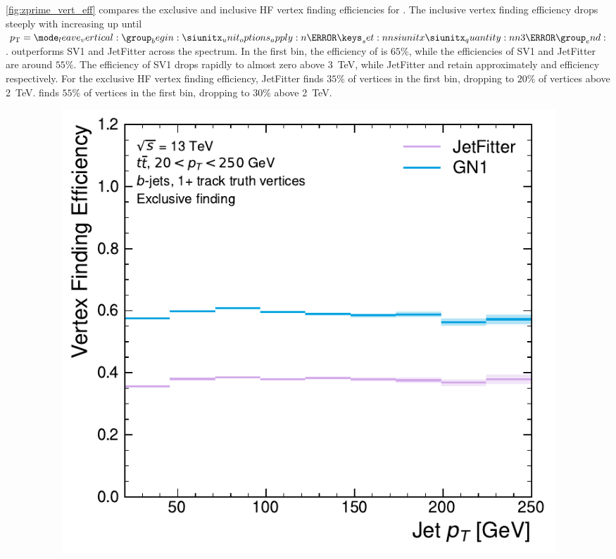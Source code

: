 \cref{fig:zprime_vert_eff} compares the exclusive and inclusive HF vertex finding efficiencies for \Zprimebjets.
The inclusive vertex finding efficiency drops steeply with increasing \pt up until $\pt = \SI{3}{\TeV}$.
\GNN outperforms SV1 and JetFitter across the \pt spectrum.
In the first bin, the efficiency of \GNN is $65\%$, while the efficiencies of SV1 and JetFitter are around $55\%$.
The efficiency of SV1 drops rapidly to almost zero above \SI{3}{\TeV}, while JetFitter and \GNN retain approximately  and  efficiency respectively.
For the exclusive HF vertex finding efficiency, JetFitter finds $35\%$ of vertices in the first bin, dropping to $20\%$ of vertices above \SI{2}{\TeV}.
\GNN finds $55\%$ of vertices in the first bin, dropping to $30\%$ above \SI{2}{\TeV}.


\begin{figure}[!htbp]
    \centering
    \begin{subfigure}[b]{0.48\textwidth}
        \centering
        \includegraphics[width=\textwidth]{chapters/gnn_tagger/figs/results/tracks/ttbar/ttbar_bjet_vert_eff_1+_track_excl.pdf}
    \end{subfigure}
    \quad
    \begin{subfigure}[b]{0.48\textwidth}
        \centering

\end{subfigure}
\end{figure}
